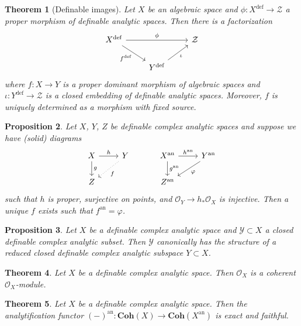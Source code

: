 \documentclass{amsart}
\newtheorem{theorem}{Theorem}[section]
\newtheorem{proposition}[theorem]{Proposition}
\theoremstyle{definition}
\numberwithin{equation}{section}
\newcommand{\definable}{\mathrm{def}}
\newcommand{\analytic}{\mathrm{an}}
\begin{document}
\begin{theorem}[Definable images]
    Let $X$ be an algebraic space and 
    $\phi: X^{\definable} \to \mathcal{Z}$ a proper morphism of definable analytic spaces.
    Then there is a factorization
    \[\begin{tikzcd}
    X^{\definable}\ar[rr,"\phi"]\ar[dr,"f^{\definable}"'] & & \mathcal{Z} \\
    & Y^{\definable}\ar[ur,"\iota"'] &
    \end{tikzcd}\]
    where $f: X\to Y$ is a proper dominant morphism of algebraic spaces and 
    $\iota: Y^{\definable} \to \mathcal{Z}$ is a closed embedding of definable analytic spaces.
    Moreover, $f$ is uniquely determined as a morphism with fixed source.
\end{theorem}

\begin{proposition}
    Let $X$, $Y$, $Z$ be definable complex analytic spaces and
    suppose we have (solid) diagrams
    \[
    \begin{tikzcd}
        X \ar[r,"h"] \ar[d,"g"] & Y\ar[dl,"f",dotted] \\ Z 
    \end{tikzcd}
    \hspace*{30pt}
    \begin{tikzcd}
        X^{\analytic} \ar[r,"h^{\analytic}"] \ar[d,"g^{\analytic}"] & Y^{\analytic}\ar[dl,"\varphi"] \\ Z^{\analytic} 
    \end{tikzcd}
    \]
    such that $h$ is proper, surjective on points,
    and $\mathcal{O}_Y \to h_*\mathcal{O}_X$ is injective.
    Then a unique $f$ exists such that $f^{\analytic} = \varphi$.
\end{proposition}

\begin{proposition}
    Let $X$ be a definable complex analytic space and 
    $\mathcal{Y} \subset X$ a closed definable complex analytic subset.
    Then $\mathcal{Y}$ canonically has the structure of a reduced closed definable complex analytic subspace $Y \subset X$.
\end{proposition}

\begin{theorem}
    Let $X$ be a definable complex analytic space.
    Then $\mathcal{O}_X$ is a coherent $\mathcal{O}_X$-module.
\end{theorem}

\begin{theorem}
    Let $X$ be a definable complex analytic space.
    Then the analytification functor 
    $(-)^{\analytic}: \mathbf{Coh}(X) \to \mathbf{Coh}(X^{\analytic})$ is exact and faithful.
\end{theorem}
\end{document}

